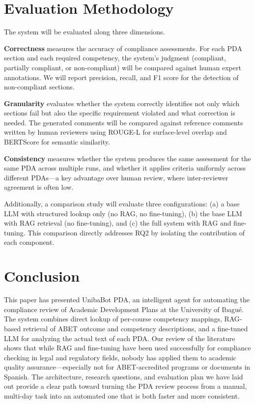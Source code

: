 \documentclass[conference]{IEEEtran}
\begin{document}
\section{Evaluation Methodology}

The system will be evaluated along three dimensions.

\textbf{Correctness} measures the accuracy of compliance assessments. For each PDA section and each required competency, the system's judgment (compliant, partially compliant, or non-compliant) will be compared against human expert annotations. We will report precision, recall, and F1 score for the detection of non-compliant sections.

\textbf{Granularity} evaluates whether the system correctly identifies not only which sections fail but also the specific requirement violated and what correction is needed. The generated comments will be compared against reference comments written by human reviewers using ROUGE-L \cite{lin2004rouge} for surface-level overlap and BERTScore \cite{zhang2020bertscore} for semantic similarity.

\textbf{Consistency} measures whether the system produces the same assessment for the same PDA across multiple runs, and whether it applies criteria uniformly across different PDAs---a key advantage over human review, where inter-reviewer agreement is often low.

Additionally, a comparison study will evaluate three configurations: (a) a base LLM with structured lookup only (no RAG, no fine-tuning), (b) the base LLM with RAG retrieval (no fine-tuning), and (c) the full system with RAG and fine-tuning. This comparison directly addresses RQ2 by isolating the contribution of each component.

\section{Conclusion}

This paper has presented UnibaBot PDA, an intelligent agent for automating the compliance review of Academic Development Plans at the University of Ibagu\'{e}. The system combines direct lookup of per-course competency mappings, RAG-based retrieval of ABET outcome and competency descriptions, and a fine-tuned LLM for analyzing the actual text of each PDA. Our review of the literature shows that while RAG and fine-tuning have been used successfully for compliance checking in legal and regulatory fields, nobody has applied them to academic quality assurance---especially not for ABET-accredited programs or documents in Spanish. The architecture, research questions, and evaluation plan we have laid out provide a clear path toward turning the PDA review process from a manual, multi-day task into an automated one that is both faster and more consistent.
\end{document}
